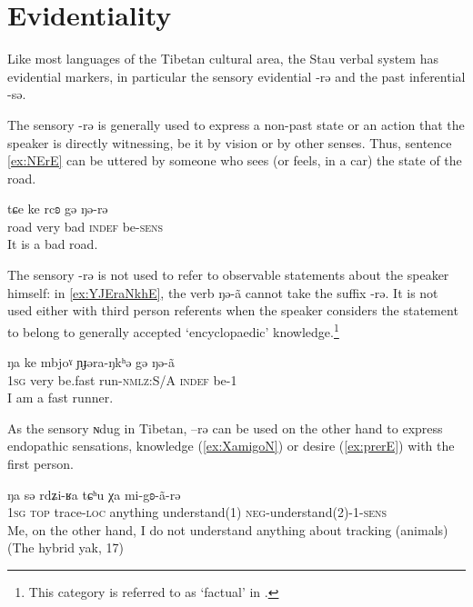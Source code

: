 \documentclass[oneside,a4paper,11pt]{article}
\newcommand{\ipa}[1]{{\phon #1}} %
\begin{document}
\section{Evidentiality}

Like most languages of the Tibetan cultural area, the Stau verbal system has evidential markers, in particular the sensory evidential \ipa{-rə} and the past inferential \ipa{-sə}.

The sensory  \ipa{-rə} is generally used to express a non-past state or an action that the speaker is directly witnessing, be it by vision or by other senses. Thus, sentence \ref{ex:NErE} can be uttered by someone who sees (or feels, in a car) the state of the road.

 \begin{exe}
\ex \label{ex:NErE}
\gll
\ipa{tɕe} 	\ipa{ke} 	\ipa{rcʚ} 	\ipa{gə} 	\ipa{ŋə-rə}  \\
road very bad \textsc{indef} be-\textsc{sens} \\
\glt It is a bad road.
 \end{exe}
 
The sensory \ipa{-rə} is not used to refer to observable statements about the speaker himself: in \ref{ex:YJEraNkhE},  the verb \ipa{ŋə-ã} cannot take  the suffix \ipa{-rə}. It is not used either with third person referents when the speaker  considers the statement  to belong to generally accepted `encyclopaedic' knowledge.\footnote{This category is referred to as `factual' in   \citet{tournadre08conjunct}.} 

  \begin{exe}
\ex \label{ex:YJEraNkhE}
\gll
  \ipa{ŋa} 	\ipa{ke} \ipa{mbjoˠ} 	\ipa{ɲɟəra-ŋkʰə} 	\ipa{gə} 	\ipa{ŋə-ã} \\
\textsc{1sg} very be.fast run-\textsc{nmlz}:S/A \textsc{indef} be-1 \\
\glt I am a fast runner.
  \end{exe}
  
 
  
As the sensory \ipa{ɴdug} in Tibetan, \ipa{--rə}  can be used on the other hand   to express endopathic sensations, knowledge (\ref{ex:XamigoN}) or desire (\ref{ex:prerE}) with the first person.

\begin{exe}
\ex \label{ex:XamigoN}
\gll
\ipa{ŋa} 	\ipa{sə} 	\ipa{rdʑi-ʁa} 	\ipa{tɕʰu} 	\ipa{χa} 	\ipa{mi-gʚ-ã-rə} 	\\
\textsc{1sg} \textsc{top} trace-\textsc{loc} anything understand(1) \textsc{neg}-understand(2)-1-\textsc{sens} \\
\glt Me, on the other hand, I do not understand anything about tracking (animals) (The hybrid yak, 17)
\end{exe}
\end{document}
